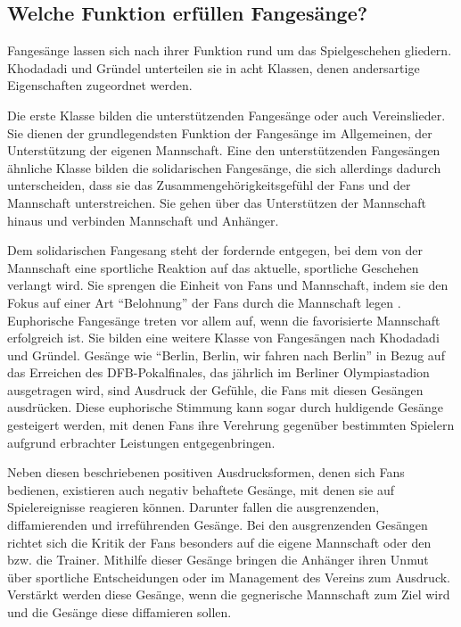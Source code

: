 \subsection{Welche Funktion erfüllen Fangesänge?}
Fangesänge lassen sich nach ihrer Funktion rund um das Spielgeschehen gliedern.
Khodadadi und Gründel unterteilen sie in acht Klassen, denen andersartige Eigenschaften zugeordnet werden. \cite[S. 10]{FK14}

Die erste Klasse bilden die unterstützenden Fangesänge oder auch Vereinslieder.
Sie dienen der grundlegendsten Funktion der Fangesänge im Allgemeinen, der Unterstützung der eigenen Mannschaft.
Eine den unterstützenden Fangesängen ähnliche Klasse bilden die solidarischen Fangesänge, die sich allerdings dadurch unterscheiden, dass sie das Zusammengehörigkeitsgefühl der Fans und der Mannschaft unterstreichen.
Sie gehen über das Unterstützen der Mannschaft hinaus und verbinden Mannschaft und Anhänger.

Dem solidarischen Fangesang steht der fordernde entgegen, bei dem von der Mannschaft eine sportliche Reaktion auf das aktuelle, sportliche Geschehen verlangt wird.
Sie sprengen die Einheit von Fans und Mannschaft, indem sie den Fokus auf einer Art "`Belohnung"' der Fans durch die Mannschaft legen \cite[S. 10]{FK14}.
Euphorische Fangesänge treten vor allem auf, wenn die favorisierte Mannschaft erfolgreich ist.
Sie bilden eine weitere Klasse von Fangesängen nach Khodadadi und Gründel.
Gesänge wie "`Berlin, Berlin, wir fahren nach Berlin"' in Bezug auf das Erreichen des DFB-Pokalfinales, das jährlich im Berliner Olympiastadion ausgetragen wird, sind Ausdruck der Gefühle, die Fans mit diesen Gesängen ausdrücken.
Diese euphorische Stimmung kann sogar durch huldigende Gesänge gesteigert werden, mit denen Fans ihre Verehrung gegenüber bestimmten Spielern aufgrund erbrachter Leistungen entgegenbringen.

Neben diesen beschriebenen positiven Ausdrucksformen, denen sich Fans bedienen, existieren auch negativ behaftete Gesänge, mit denen sie auf Spielereignisse reagieren können.
Darunter fallen die ausgrenzenden, diffamierenden und irreführenden Gesänge.
Bei den ausgrenzenden Gesängen richtet sich die Kritik der Fans besonders auf die eigene Mannschaft oder den bzw. die Trainer.
Mithilfe dieser Gesänge bringen die Anhänger ihren Unmut über sportliche Entscheidungen oder im Management des Vereins zum Ausdruck.
Verstärkt werden diese Gesänge, wenn die gegnerische Mannschaft zum Ziel wird und die Gesänge diese diffamieren sollen.

